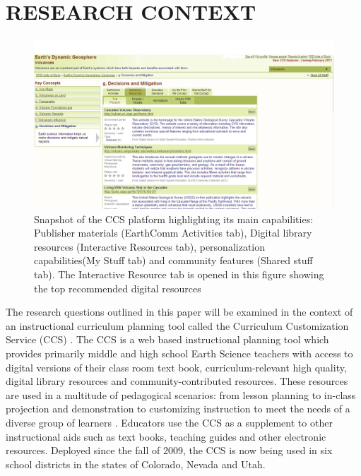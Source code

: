 \documentclass{acm_proc_article-sp}
\begin{document}
\section{RESEARCH CONTEXT}
\label{researchcontext}
\begin{figure}
\includegraphics[width=1 \linewidth]{./ccsimage}
\caption{Snapshot of the CCS platform highlighting its main capabilities: Publisher materials (EarthComm Activities tab), Digital library resources (Interactive Resources tab), personalization capabilities(My Stuff tab) and community features (Shared stuff tab). The Interactive Resource tab is opened in this figure showing the top recommended digital resources}
\label{fig:ccsimage}
\end{figure}

The research questions outlined in this paper will be examined in the context of an instructional curriculum planning tool called the Curriculum Customization Service (CCS) \cite{sumner:team}. The CCS is a web based instructional planning tool which provides primarily middle and high school Earth Science teachers with access to digital versions of their class room text book, curriculum-relevant high quality, digital library resources and community-contributed resources. These resources are used in a multitude of pedagogical scenarios: from lesson planning to in-class projection and demonstration to customizing instruction to meet the needs of a diverse group of learners \cite{Saldivar:2012}. Educators use the CCS as a supplement to other instructional aids such as text books, teaching guides and other electronic resources. Deployed since the fall of 2009, the CCS is now being used in six school districts in the states of Colorado, Nevada and Utah. 
\end{document}
